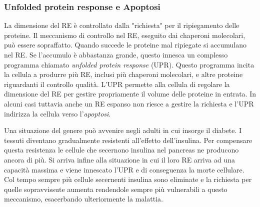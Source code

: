 {{}
\subsubsection{Unfolded protein response e Apoptosi}
{

La dimensione del RE è controllato dalla "richiesta" per il ripiegamento delle proteine. Il meccanismo di controllo nel RE, eseguito dai chaperoni molecolari, può essere sopraffatto. Quando succede le proteine mal ripiegate si accumulano nel RE. 
Se l'accumulo è abbastanza grande, questo innesca un complesso programma chiamato \textit{unfolded protein response} (UPR). Questo programma incita la cellula a produrre più RE, inclusi più chaperoni molecolari, e altre proteine riguardanti il controllo qualità. L'UPR permette alla cellula di regolare la dimensione del RE per gestire propriamente il volume delle proteine in entrata. In alcuni casi tuttavia anche un RE espanso non riesce a gestire la richiesta e l'UPR indirizza la cellula verso l'\textit{apoptosi}.

\par Una situazione del genere può avvenire negli adulti in cui insorge il diabete. I tessuti diventano gradualmente resistenti all'effetto dell'insulina. Per compensare questa resistenza le cellule che secernono insulina nel pancreas ne producono ancora di più. Si arriva infine alla situazione in cui il loro RE arriva ad una capacità massima e viene innescato l'UPR e di conseguenza la morte cellulare. Col tempo sempre più cellule secernenti insulina sono eliminate e la richiesta per quelle sopravvissute aumenta rendendole sempre più vulnerabili a questo meccanismo, esacerbando ulteriormente la malattia\supercite{alberts2018essential}.
}
}

